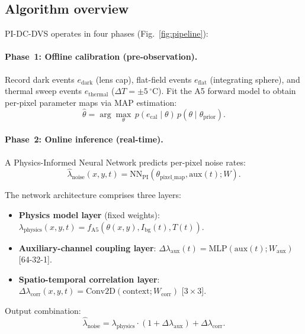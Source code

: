 \documentclass[twocolumn]{article}
\begin{document}
\subsection{Algorithm overview}

PI-DC-DVS operates in four phases (Fig.~\ref{fig:pipeline}):

\paragraph{Phase~1: Offline calibration (pre-observation).}
Record dark events $e_\mathrm{dark}$ (lens cap), flat-field events $e_\mathrm{flat}$ (integrating sphere), and thermal sweep events $e_\mathrm{thermal}$ ($\Delta T = \pm 5\,^\circ$C).
Fit the A5 forward model \citep{A5} to obtain per-pixel parameter maps via MAP estimation:
\begin{equation}
  \hat{\theta} = \arg\max_\theta\, p(e_\mathrm{cal} \mid \theta)\, p(\theta \mid \theta_\mathrm{prior}).
\end{equation}

\paragraph{Phase~2: Online inference (real-time).}
A Physics-Informed Neural Network predicts per-pixel noise rates:
\begin{equation}
  \hat{\lambda}_\mathrm{noise}(x,y,t) = \mathrm{NN}_\mathrm{PI}(\theta_\mathrm{pixel\_map}, \mathrm{aux}(t); W).
\end{equation}

The network architecture comprises three layers:
\begin{itemize}
  \item \textbf{Physics model layer} (fixed weights): $\lambda_\mathrm{physics}(x,y,t) = f_\mathrm{A5}(\theta(x,y), I_\mathrm{bg}(t), T(t))$.
  \item \textbf{Auxiliary-channel coupling layer}: $\Delta\lambda_\mathrm{aux}(t) = \mathrm{MLP}(\mathrm{aux}(t); W_\mathrm{aux})$ [64-32-1].
  \item \textbf{Spatio-temporal correlation layer}: $\Delta\lambda_\mathrm{corr}(x,y,t) = \mathrm{Conv2D}(\mathrm{context}; W_\mathrm{corr})$ [$3\times3$].
\end{itemize}
Output combination:
\begin{equation}
  \hat{\lambda}_\mathrm{noise} = \lambda_\mathrm{physics} \cdot (1 + \Delta\lambda_\mathrm{aux}) + \Delta\lambda_\mathrm{corr}.
\end{equation}
\end{document}
